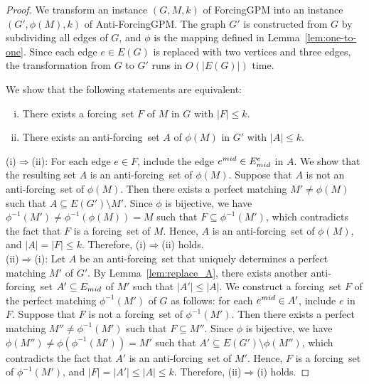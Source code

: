 \documentclass[10pt,a4paper]{amsart}
\newcommand{\AFGPM}{\sc Anti-ForcingGPM}
\newcommand{\AFS}{\rm anti-forcing~set}
\newcommand{\FGPM}{\sc ForcingGPM} %
\newcommand{\FS}{\rm forcing~set}
\begin{document}
\begin{proof}
We transform an instance $(G, M, k)$ of {\FGPM} into an instance $(G', \phi(M), k)$ of {\AFGPM}.
The graph $G'$ is constructed from $G$ by subdividing all edges of $G$, and $\phi$ is the mapping defined in Lemma~\ref{lem:one-to-one}.
Since each edge $e \in E(G)$ is replaced with two vertices and three edges, the transformation from $G$ to $G'$ runs in $O(|E(G)|)$ time.

We show that the following statements are equivalent:
\begin{enumerate}[(i)]
    \item There exists a {\FS} $F$ of $M$ in $G$ with $|F| \le k$.
    \item There exists an {\AFS} $A$ of $\phi(M)$ in $G'$ with $|A| \le k$.
\end{enumerate}

\noindent (i)$\Rightarrow$(ii):
For each edge $e \in F$, include the edge $e^{\textnormal{mid}} \in E^e_{\textnormal{mid}}$ in $A$.
We show that the resulting set $A$ is an {\AFS} of $\phi(M)$.
Suppose that $A$ is not an {\AFS} of $\phi(M)$.
Then there exists a perfect matching $M' \neq \phi(M)$ such that $A \subseteq E(G') \setminus M'$.
Since $\phi$ is bijective, we have $\phi^{-1}(M') \neq \phi^{-1}(\phi(M)) = M$ such that $F \subseteq \phi^{-1}(M')$, which contradicts the fact that $F$ is a {\FS} of $M$.
Hence, $A$ is an {\AFS} of $\phi(M)$, and $|A| = |F| \le k$.
Therefore, (i)$\Rightarrow$(ii) holds.\\

\noindent (ii)$\Rightarrow$(i):
Let $A$ be an {\AFS} that uniquely determines a perfect matching $M'$ of $G'$.
By Lemma~\ref{lem:replace_A}, there exists another {\AFS} $A' \subseteq E_{\textnormal{mid}}$ of $M'$ such that $|A'| \le |A|$.
We construct a {\FS} $F$ of the perfect matching $\phi^{-1}(M')$ of $G$ as follows: for each $e^{\textnormal{mid}} \in A'$, include $e$ in $F$.
Suppose that $F$ is not a {\FS} of $\phi^{-1}(M')$.
Then there exists a perfect matching $M'' \neq \phi^{-1}(M')$ such that $F \subseteq M''$.
Since $\phi$ is bijective, we have $\phi(M'') \neq \phi(\phi^{-1}(M')) = M'$ such that $A' \subseteq E(G') \setminus \phi(M'')$, which contradicts the fact that $A'$ is an {\AFS} of $M'$.
Hence, $F$ is a {\FS} of $\phi^{-1}(M')$, and $|F| = |A'| \le |A| \le k$.
Therefore, (ii)$\Rightarrow$(i) holds.
\end{proof}
\end{document}
